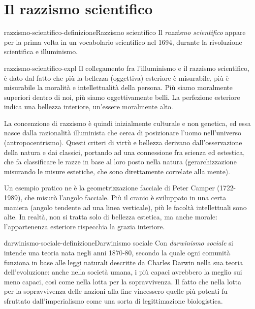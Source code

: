 \documentclass[preview]{standalone}
\begin{document}
\section{Il razzismo scientifico}

\begin{snippetdefinition}{razzismo-scientifico-definizione}{Razzismo scientifico}
    Il \textit{razzismo scientifico} appare per la prima volta in un vocabolario scientifico nel 1694,
    durante la rivoluzione scientifica e illuminismo.
\end{snippetdefinition}

\begin{snippet}{razzismo-scientifico-expl}
    Il collegamento fra l'illuminismo e il razzismo scientifico, è dato dal fatto che più
    la bellezza (oggettiva) esteriore è misurabile, più è misurabile la moralità e intellettualità della persona.
    Più siamo moralmente superiori dentro di noi, più siamo oggettivamente belli.
    La perfezione esteriore indica una bellezza interiore, un'essere moralmente alto.
    
    La concenzione di razzismo è quindi inizialmente culturale e non genetica,
    ed essa nasce dalla razionalità illuminista che cerca di posizionare l'uomo nell'universo (antropocentrismo).
    Questi criteri di virtù e bellezza derivano dall'osservazione della natura e dai classici,
    portando ad una connessione fra scienza ed estestica, che fa classificare le razze
    in base al loro posto nella natura (gerarchizzazione misurando le misure estetiche, che
    sono direttamente correlate alla mente).
    
    Un esempio pratico ne è la geometrizzazione facciale di Peter Camper (1722-1989),
    che misurò l'angolo facciale. Più il cranio è sviluppato in una certa maniera (angolo tendente ad una linea verticale),
    più le facoltà intellettuali sono alte. In realtà, non si
    tratta solo di bellezza estetica, ma anche morale: l'appartenenza esteriore rispecchia
    la grazia interiore.
\end{snippet}

\begin{snippetdefinition}{darwinismo-sociale-definizione}{Darwinismo sociale}
    Con \textit{darwinismo sociale} si intende una teoria nata negli anni 1870-80, secondo la quale ogni comunità
    funziona in base alle leggi naturali descritte da Charles Darwin nella sua teoria
    dell'evoluzione: anche nella società umana, i più capaci avrebbero la meglio sui meno
    capaci, così come nella lotta per la sopravvivenza. Il fatto che nella lotta per la sopravvivenza
    delle nazioni alla fine vincessero quelle più potenti fu sfruttato dall'imperialismo come una
    sorta di legittimazione biologistica.
\end{snippetdefinition}
\end{document}
